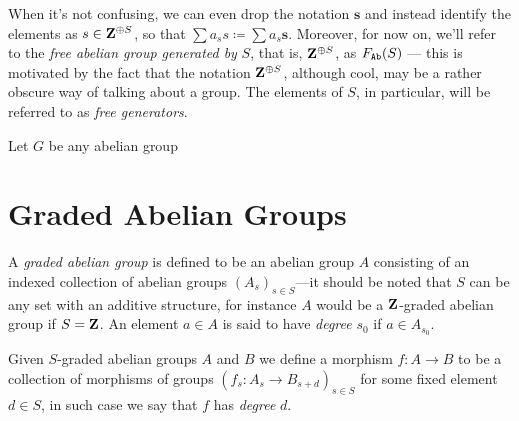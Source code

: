 \begin{notation}
    When it's not confusing, we can even drop the notation \(\mathbf{s}\) and
    instead identify the elements as \(s \in \mathbf{Z}^{\oplus S}\), so that
    \(\sum a_s s \coloneq \sum a_s \mathbf{s}\). Moreover, for now on, we'll refer
    to the \emph{free abelian group generated by} \(S\), that is, \(\mathbf{Z}^{\oplus S}\),
    as \(F_{{\texttt{Ab}}}(S)\) --- this is motivated by the fact that the notation
    \(\mathbf{Z}^{\oplus S}\), although cool, may be a rather obscure way of talking about a
    group. The elements of \(S\), in particular, will be referred to as \emph{free
        generators}.
\end{notation}

\begin{proposition}
    \label{prop:Ab-isomorphic-factor-of-free}
    Let \(G\) be any abelian group
\end{proposition}


\section{Graded Abelian Groups}

\begin{definition}
    \label{def:graded-abelian-group}
    A \emph{graded abelian group} is defined to be an abelian group \(A\) consisting
    of an indexed collection of abelian groups \((A_s)_{s \in S}\)---it should be
    noted that \(S\) can be any set with an additive structure, for instance \(A\)
    would be a \(\mathbf{Z}\)-graded abelian group if \(S = \mathbf{Z}\). An element \(a \in A\) is
    said to have \emph{degree} \(s_0\) if \(a \in A_{s_0}\).

    Given \(S\)-graded abelian groups \(A\) and \(B\) we define a morphism
    \(f: A \to B\) to be a collection of morphisms of groups
    \((f_s: A_s \to B_{s+d})_{s \in S}\) for some fixed element \(d \in S\), in such
    case we say that \(f\) has \emph{degree} \(d\).
\end{definition}

